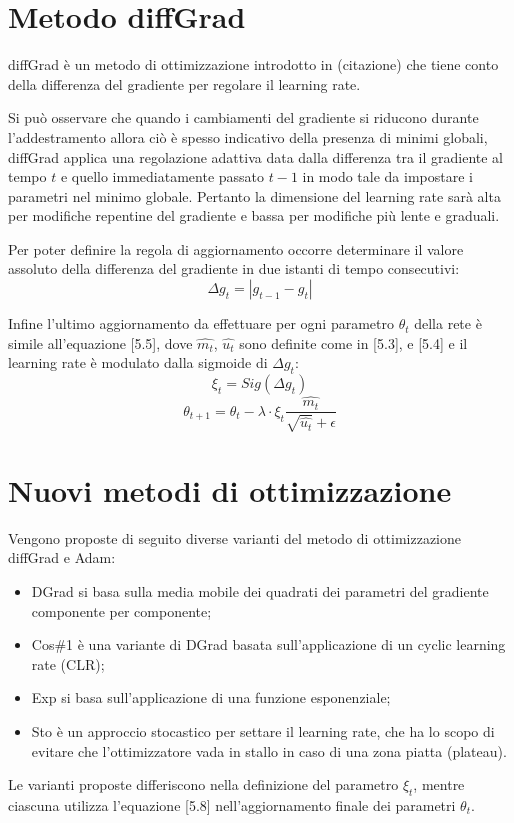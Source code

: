 \section{Metodo diffGrad}
diffGrad è un metodo di ottimizzazione introdotto in (citazione) che tiene conto della differenza del gradiente per regolare il learning rate.

Si può osservare che quando i cambiamenti del gradiente si riducono durante l'addestramento allora ciò è spesso indicativo della presenza di minimi globali, diffGrad applica una regolazione adattiva data dalla differenza tra il gradiente al tempo $t$ e quello immediatamente passato $t-1$ in modo tale da impostare i parametri nel minimo globale. Pertanto la dimensione del learning rate sarà alta per modifiche repentine del gradiente e bassa per modifiche più lente e graduali.

Per poter definire la regola di aggiornamento occorre determinare il valore assoluto della differenza del gradiente in due istanti di tempo consecutivi:
\begin{equation}
	\Delta g_{t} = |g_{t-1}-g_{t}|
\end{equation}

Infine l'ultimo aggiornamento da effettuare per ogni parametro $\theta_{t}$ della rete è simile all'equazione [5.5], dove $\hat{m_{t}}$, $\hat{u_{t}}$ sono definite come in [5.3], e [5.4] e il learning rate è modulato dalla sigmoide di $\Delta g_{t}$:
\begin{equation}
	\xi_{t} = Sig(\Delta g_{t})
\end{equation}
\begin{equation}
	\theta_{t+1} = \theta_{t}-\lambda\cdot\xi_{t}\frac{\hat{m_{t}}}{\sqrt{\hat{u_{t}}}+\epsilon}
\end{equation}
 
\section{Nuovi metodi di ottimizzazione}
Vengono proposte di seguito diverse varianti del metodo di ottimizzazione diffGrad e Adam:
\begin{itemize}
	\item DGrad si basa sulla media mobile dei quadrati dei parametri del gradiente componente per componente;
	\item Cos\#1 è una variante di DGrad basata sull'applicazione di un cyclic learning rate (CLR);
	\item Exp si basa sull'applicazione di una funzione esponenziale;
	\item Sto è un approccio stocastico per settare il learning rate, che ha lo scopo di evitare che l'ottimizzatore vada in stallo in caso di una zona piatta (plateau).
\end{itemize}
Le varianti proposte differiscono nella definizione del parametro $\xi_{t}$, mentre ciascuna utilizza l'equazione [5.8] nell'aggiornamento finale dei parametri $\theta_{t}$. 

